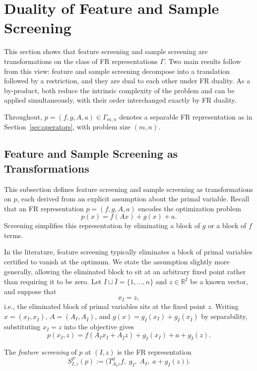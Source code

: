 \section{Duality of Feature and Sample Screening}
\label{sec:screening}

This section shows that feature screening and sample screening are
transformations on the class of FR representations \(\Gamma\). Two
main results follow from this view: feature and sample screening
decompose into a translation followed by a restriction, and they are
dual to each other under FR duality. As a by-product,
both reduce the intrinsic complexity of the problem and can be applied
simultaneously, with their order interchanged exactly by FR duality.

Throughout, \(p=(f,g,A,a)\in\Gamma_{m,n}\) denotes a
separable FR representation as in
Section~\ref{sec:operators}, with problem size \((m,n)\).

\subsection{Feature and Sample Screening as Transformations}

This subsection defines feature screening and sample screening as
transformations on \(p\), each derived from an explicit assumption
about the primal variable. Recall that an FR
representation \(p=(f,g,A,a)\) encodes the optimization problem
\[
p(x)=f(Ax)+g(x)+a.
\]
Screening simplifies this representation by eliminating a block of $g$ or a block of $f$ terms.

In the literature, feature screening typically eliminates a block of
primal variables certified to vanish at the optimum. We state the
assumption slightly more generally, allowing the eliminated block to
sit at an arbitrary fixed point rather than requiring it to be zero.
Let \(I\sqcup\bar I=\{1,\ldots,n\}\) and \(z\in\mathbb R^{\bar I}\) be a known vector, and
suppose that
\[
x_{\bar I}=z,
\]
i.e., the eliminated block of primal variables sits at the fixed point
\(z\). Writing \(x=(x_I,x_{\bar I})\), \(A=(A_I,A_{\bar I})\), and
\(g(x)=g_I(x_I)+g_{\bar I}(x_{\bar I})\) by separability, substituting
\(x_{\bar I}=z\) into the objective gives
\[
p(x_I,z)
=
f(A_Ix_I+A_{\bar I}z)+g_I(x_I)+a+g_{\bar I}(z).
\]

\begin{definition}
The \emph{feature screening} of \(p\) at \((I,z)\) is the FR
representation
\[
S^{F}_{I,z}(p)
:=
\bigl(
T^{\mathrm d}_{A_{\bar I}z}f,\;
g_I,\;
A_I,\;
a+g_{\bar I}(z)
\bigr).
\]
\end{definition}


